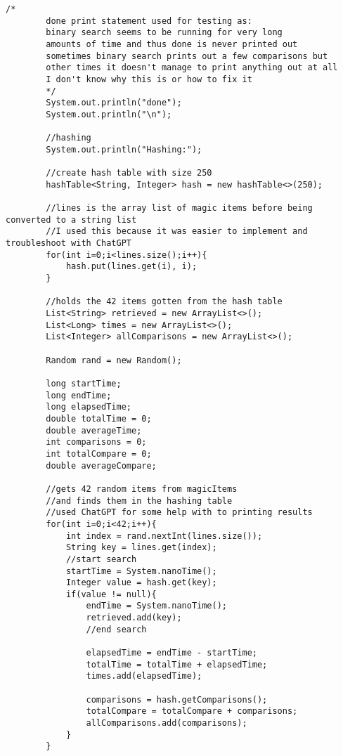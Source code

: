\documentclass[10pt]{article}
\begin{document}
\begin{lstlisting}[frame=single, ]
        /*
        done print statement used for testing as:
        binary search seems to be running for very long
        amounts of time and thus done is never printed out
        sometimes binary search prints out a few comparisons but
        other times it doesn't manage to print anything out at all
        I don't know why this is or how to fix it
        */
        System.out.println("done");
        System.out.println("\n");

        //hashing
        System.out.println("Hashing:");

        //create hash table with size 250
        hashTable<String, Integer> hash = new hashTable<>(250);

        //lines is the array list of magic items before being converted to a string list
        //I used this because it was easier to implement and troubleshoot with ChatGPT
        for(int i=0;i<lines.size();i++){
            hash.put(lines.get(i), i);
        }

        //holds the 42 items gotten from the hash table
        List<String> retrieved = new ArrayList<>();
        List<Long> times = new ArrayList<>();
        List<Integer> allComparisons = new ArrayList<>();

        Random rand = new Random();

        long startTime;
        long endTime;
        long elapsedTime;
        double totalTime = 0;
        double averageTime;
        int comparisons = 0;
        int totalCompare = 0;
        double averageCompare;

        //gets 42 random items from magicItems 
        //and finds them in the hashing table
        //used ChatGPT for some help with to printing results
        for(int i=0;i<42;i++){
            int index = rand.nextInt(lines.size());
            String key = lines.get(index);
            //start search
            startTime = System.nanoTime();
            Integer value = hash.get(key);
            if(value != null){
                endTime = System.nanoTime();
                retrieved.add(key);
                //end search

                elapsedTime = endTime - startTime;
                totalTime = totalTime + elapsedTime;
                times.add(elapsedTime);

                comparisons = hash.getComparisons();
                totalCompare = totalCompare + comparisons;
                allComparisons.add(comparisons);
            }
        }


\end{lstlisting}
\end{document}
